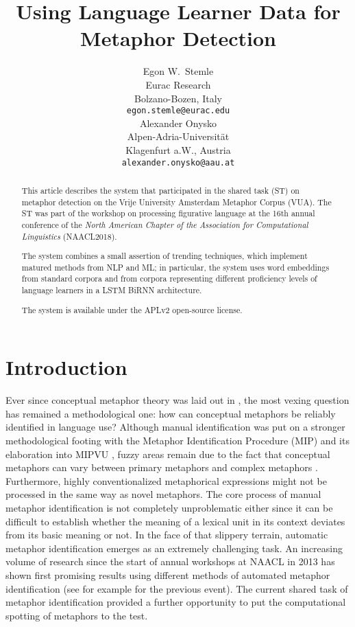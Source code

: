 \documentclass[11pt,a4paper]{article}
\title{Using Language Learner Data for Metaphor Detection}
\author{Egon W.~Stemle \\
  Eurac Research \\
  Bolzano-Bozen, Italy \\
  {\tt egon.stemle@eurac.edu} \\\And
  Alexander Onysko \\
  Alpen-Adria-Universität \\
  Klagenfurt a.W., Austria \\
  {\tt alexander.onysko@aau.at} \\}
\date{}
\begin{document}
\maketitle
\begin{abstract}
This article describes the system that participated in the shared task (ST) on metaphor detection \cite{Leong2018} on the Vrije University Amsterdam Metaphor Corpus (VUA).
The ST was part of the workshop on processing figurative language at the 16th annual conference of the \emph{North American Chapter of the Association for Computational Linguistics} (NAACL2018).

The system combines a small assertion of trending techniques, which implement matured methods from NLP and ML; 
in particular, the system uses word embeddings from standard corpora and from corpora representing different proficiency levels of language learners in a LSTM BiRNN architecture.

The system is available under the APLv2 open-source license.
\end{abstract}


\section{Introduction} %
\label{sec:intro}
 
Ever since conceptual metaphor theory was laid out in , the most vexing question has remained a methodological one: how can conceptual metaphors be reliably identified in language use? Although manual identification was put on a stronger methodological footing with the Metaphor Identification Procedure (MIP) \cite{doi:10.1080/10926480709336752} and its elaboration into MIPVU \cite{Steen2010}, fuzzy areas remain due to the fact that conceptual metaphors can vary between primary metaphors and complex metaphors \cite[cf.][]{Grady1997}. 
Furthermore, highly conventionalized metaphorical expressions might not be processed in the same way as novel metaphors. The core process of manual metaphor identification is not completely unproblematic either since it can be difficult to establish whether the meaning of a lexical unit in its context deviates from its basic meaning or not. 
In the face of that slippery terrain, automatic metaphor identification emerges as an extremely challenging task. 
An increasing volume of research since the start of annual workshops at NAACL in 2013 has shown first promising results using different methods of automated metaphor identification (see for example  for the previous event).
The current shared task of metaphor identification provided a further opportunity to put the computational spotting of metaphors to the test.
\end{document}
